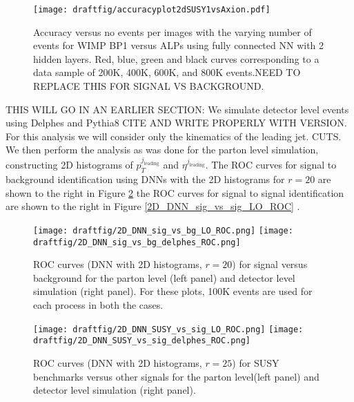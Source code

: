 \documentclass[aps,onecolumn,showpacs,superscriptaddress,groupedaddress,nofootinbib,preprint]{revtex4-1}
\begin{document}
\begin{figure}%
\centering
\texttt{[image: draftfig/accuracyplot2dSUSY1vsAxion.pdf]}
\caption{Accuracy versus no events per images with the varying number of events for WIMP BP1 versus ALPs using fully connected NN with 2 hidden layers. Red, blue,
green and black curves corresponding to a data sample of 200K, 400K, 600K, and 800K events.NEED TO REPLACE THIS FOR SIGNAL VS BACKGROUND.} \label{accuracy1}
\end{figure}
THIS WILL GO IN AN EARLIER SECTION: We simulate detector level events using Delphes and Pythia8 CITE AND WRITE PROPERLY WITH VERSION. For this analysis we will consider only the kinematics of the leading jet. CUTS. We then perform the analysis as was done for the parton level simulation, constructing 2D histograms of $p_T^{j_{\text{leading}}}$ and $\eta^{j_{\text{leading}}}$. The ROC curves for signal to background identification using DNNs with the 2D histograms for $r=20$ are shown to the right in Figure \ref{2D_DNN_sig_vs_bg_LO_ROC} the ROC curves for signal to signal identification are shown to the right in Figure \ref{2D_DNN_sig_vs_sig_LO_ROC} .
\begin{figure}%
\centering
\texttt{[image: draftfig/2D\_DNN\_sig\_vs\_bg\_LO\_ROC.png]}
\texttt{[image: draftfig/2D\_DNN\_sig\_vs\_bg\_delphes\_ROC.png]}
\caption{ROC curves (DNN with 2D histograms, $r = 20$) for signal versus background for the parton level (left panel) and detector level simulation (right panel). For these plots, 100K events are used for each process in both the cases.}\label{2D_DNN_sig_vs_bg_LO_ROC}
\end{figure}

\begin{figure}%
\centering
\texttt{[image: draftfig/2D\_DNN\_SUSY\_vs\_sig\_LO\_ROC.png]}
\texttt{[image: draftfig/2D\_DNN\_SUSY\_vs\_sig\_delphes\_ROC.png]}
\caption{ROC curves (DNN with 2D histograms, $r = 25$) for SUSY benchmarks versus other signals for the parton level(left panel) and detector level simulation (right panel).}\label{2D_DNN_SUSY_vs_sig_LO_ROC}
\end{figure}
\end{document}
